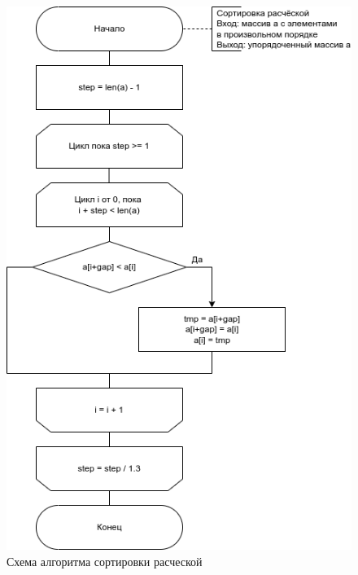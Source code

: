 \begin{figure}[h!]
	\centering
	\includegraphics[width=0.8\linewidth]{img/comb}
	\caption{Схема алгоритма сортировки расческой}
	\label{fig:comb}
\end{figure}

